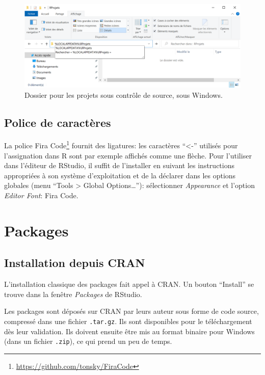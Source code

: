 \documentclass[
  12pt,
  french,
  a4paper,
  extrafontsizes,onecolumn,openright
  ]{memoir}
\begin{document}
\scriptsize

\begin{figure}

{\centering \includegraphics[width=1\linewidth]{images/R-ProjetsR} 

}

\caption{Dossier pour les projets sous contrôle de source, sous Windows.}\label{fig:R-ProjetsR}
\end{figure}

\normalsize

\subsection{Police de caractères}\label{police-de-caractuxe8res}

La police Fira Code\footnote{\url{https://github.com/tonsky/FiraCode}} fournit des ligatures: les caractères \enquote{\textless-} utilisés pour l'assignation dans R sont par exemple affichés comme une flèche.
Pour l'utiliser dans l'éditeur de RStudio, il suffit de l'installer en suivant les instructions appropriées à son système d'exploitation et de la déclarer dans les options globales (menu \enquote{Tools \textgreater{} Global Options\ldots{}}): sélectionner \emph{Appearance} et l'option \emph{Editor Font}: Fira Code.

\section{Packages}\label{packages}

\subsection{Installation depuis CRAN}\label{installation-depuis-cran}

L'installation classique des packages fait appel à CRAN.
Un bouton \enquote{Install} se trouve dans la fenêtre \emph{Packages} de RStudio.

Les packages sont déposés sur CRAN par leurs auteur sous forme de code source, compressé dans une fichier \texttt{.tar.gz}.
Ils sont disponibles pour le téléchargement dès leur validation.
Ils doivent ensuite être mis au format binaire pour Windows (dans un fichier \texttt{.zip}), ce qui prend un peu de temps.
\end{document}
